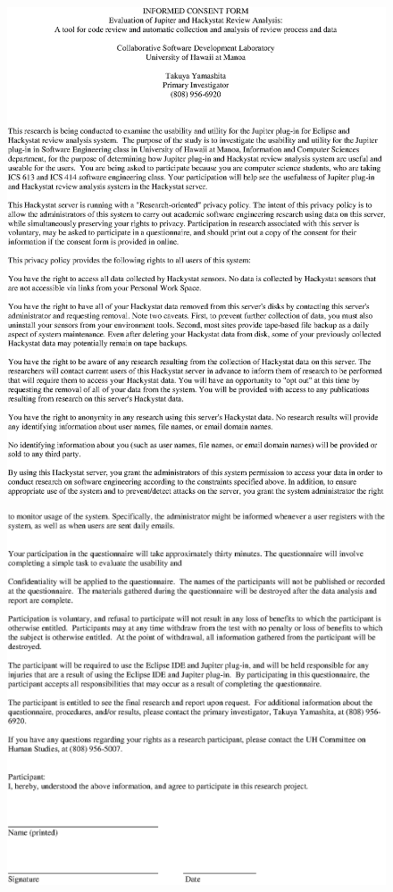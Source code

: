 \begin{figure}[htbp]
  \centering
  \includegraphics{images/appndx-4-1.eps}
  \label{appndx-4-1}
\end{figure}

\begin{figure}[htbp]
  \centering
  \includegraphics{images/appndx-4-2.eps}
  \label{appndx-4-2}
\end{figure}

